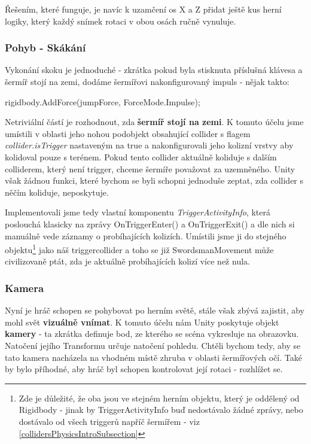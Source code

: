 Řešením, které funguje, je navíc k uzamčení os X a Z přidat ještě kus herní logiky, který každý snímek rotaci v obou osách ručně vynuluje.

\subsubsection*{Pohyb - Skákání}

Vykonání skoku je jednoduché - zkrátka pokud byla stisknuta příslušná klávesa a šermíř stojí na zemi, dodáme šermířovi nakonfigurovaný impuls - nějak takto:

\begin{code}
 rigidbody.AddForce(jumpForce, ForceMode.Impulse);
\end{code}

Netriviální částí je rozhodnout, zda \textbf{šermíř stojí na zemi}. K tomuto účelu jsme umístili v oblasti jeho nohou podobjekt obsahující collider s flagem \textit{collider.isTrigger} nastaveným na true a nakonfigurovali jeho kolizní vrstvy aby kolidoval pouze s terénem. Pokud tento collider aktuálně koliduje s dalším colliderem, který není trigger, chceme šermíře považovat za uzemněného. Unity však žádnou funkci, které bychom se byli schopni jednoduše zeptat, zda collider s něčím koliduje, neposkytuje. 

Implementovali jsme tedy vlastní komponentu \textit{TriggerActivityInfo}, která poslouchá klasicky na zprávy OnTriggerEnter() a OnTriggerExit() a dle nich si manuálně vede záznamy o probíhajících kolizích. Umístili jsme ji do stejného objektu\footnote{Zde je důležité, že oba jsou ve stejném herním objektu, který je oddělený od Rigidbody - jinak by TriggerActivityInfo buď nedostávalo žádné zprávy, nebo dostávalo od všech triggerů napříč šermířem - viz \ref{collidersPhysicsIntroSubsection}} jako náš triggercollider a toho se již SwordsmanMovement může civilizovaně ptát, zda je aktuálně probíhajících kolizí více než nula.

\subsubsection*{Kamera}

Nyní je hráč schopen se pohybovat po herním světě, stále však zbývá zajistit, aby mohl svět \textbf{vizuálně vnímat}. K tomuto účelu nám Unity poskytuje objekt \textbf{kamery} - ta zkrátka definuje bod, ze kterého se scéna vykresluje na obrazovku. Natočení jejího Transformu určuje natočení pohledu. Chtěli bychom tedy, aby se tato kamera nacházela na vhodném místě zhruba v oblasti šermířových očí. Také by bylo příhodné, aby hráč byl schopen kontrolovat její rotaci - rozhlížet se.

